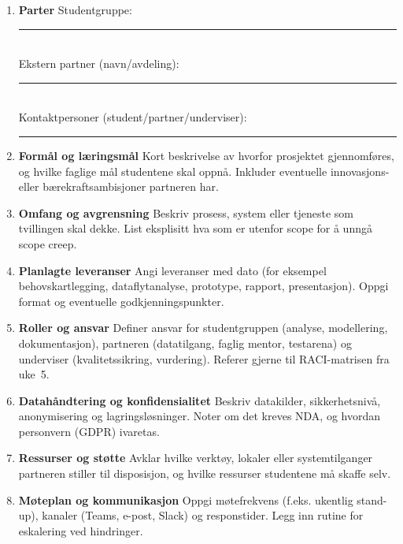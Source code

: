 \begin{enumerate}
    \item \textbf{Parter}\newline
    Studentgruppe: \rule{0.6\linewidth}{0.4pt}\\
    Ekstern partner (navn/avdeling): \rule{0.6\linewidth}{0.4pt}\\
    Kontaktpersoner (student/partner/underviser): \rule{0.6\linewidth}{0.4pt}

    \item \textbf{Formål og læringsmål}\newline
    Kort beskrivelse av hvorfor prosjektet gjennomføres, og hvilke faglige mål studentene skal oppnå. Inkluder eventuelle innovasjons- eller bærekraftsambisjoner partneren har.

    \item \textbf{Omfang og avgrensning}\newline
    Beskriv prosess, system eller tjeneste som tvillingen skal dekke. List eksplisitt hva som er utenfor scope for å unngå scope creep.

    \item \textbf{Planlagte leveranser}\newline
    Angi leveranser med dato (for eksempel behovskartlegging, dataflytanalyse, prototype, rapport, presentasjon). Oppgi format og eventuelle godkjenningspunkter.

    \item \textbf{Roller og ansvar}\newline
    Definer ansvar for studentgruppen (analyse, modellering, dokumentasjon), partneren (datatilgang, faglig mentor, testarena) og underviser (kvalitetssikring, vurdering). Referer gjerne til RACI-matrisen fra uke~5.

    \item \textbf{Datahåndtering og konfidensialitet}\newline
    Beskriv datakilder, sikkerhetsnivå, anonymisering og lagringsløsninger. Noter om det kreves NDA, og hvordan personvern (GDPR) ivaretas.

    \item \textbf{Ressurser og støtte}\newline
    Avklar hvilke verktøy, lokaler eller systemtilganger partneren stiller til disposisjon, og hvilke ressurser studentene må skaffe selv.

    \item \textbf{Møteplan og kommunikasjon}\newline
    Oppgi møtefrekvens (f.eks. ukentlig stand-up), kanaler (Teams, e-post, Slack) og responstider. Legg inn rutine for eskalering ved hindringer.


\end{enumerate}
